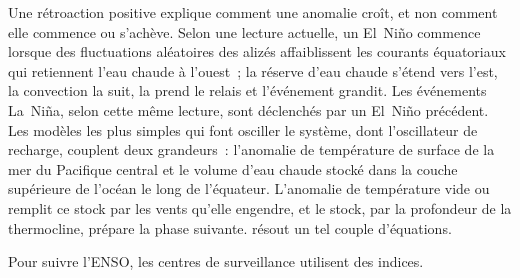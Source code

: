 \begin{omfigure}
\centering
{}
\par{}
\end{omfigure}

Une rétroaction positive explique comment une anomalie croît, et non comment elle commence ou s'achève. Selon une
lecture actuelle, un El~Niño commence lorsque des fluctuations aléatoires des alizés affaiblissent les courants
équatoriaux qui retiennent l'eau chaude à l'ouest~;
la réserve d'eau chaude s'étend vers l'est, la convection
la suit, la  prend le relais et l'événement grandit. Les événements La~Niña, selon cette
même lecture, sont déclenchés par un El~Niño précédent. Les modèles les plus simples qui font osciller le système,
dont l'oscillateur de recharge, couplent deux grandeurs~: l'anomalie de température de surface de la mer du Pacifique
central et le volume d'eau chaude stocké dans la couche supérieure de l'océan le long de l'équateur. L'anomalie de
température vide ou remplit ce stock par les vents qu'elle engendre, et le stock, par la profondeur de la thermocline,
prépare la phase suivante.  résout un tel couple d'équations.

Pour suivre l'ENSO, les centres de surveillance utilisent des indices.

